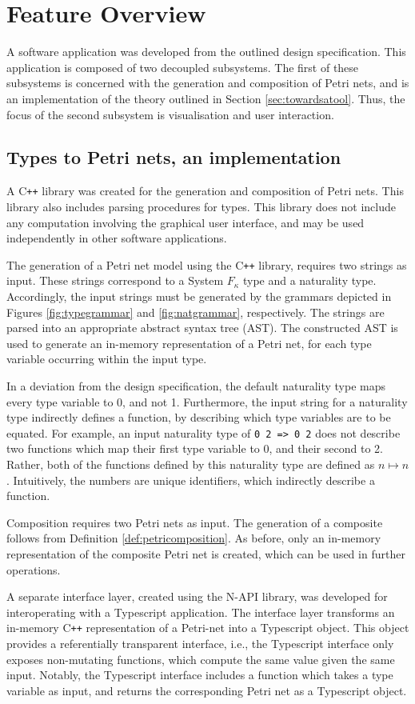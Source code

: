 \documentclass[../Dissertation.tex]{subfiles}
\begin{document}
\section{Feature Overview}
A software application was developed from the outlined design specification. This application is composed of two decoupled subsystems. The first of these subsystems is concerned with the generation and composition of Petri nets, and is an implementation of the theory outlined in Section \ref{sec:towardsatool}. Thus, the focus of the second subsystem is visualisation and user interaction.

\subsection{Types to Petri nets, an implementation}
A C\lstinline{++} library was created for the generation and composition of Petri nets. This library also includes parsing procedures for types. This library does not include any computation involving the graphical user interface, and may be used independently in other software applications.
\par
The generation of a Petri net model using the C\lstinline{++} library, requires two strings as input. These strings correspond to a System $F_\kappa$ type and a naturality type. Accordingly, the input strings must be generated by the grammars depicted in Figures \ref{fig:typegrammar} and \ref{fig:natgrammar}, respectively. The strings are parsed into an appropriate abstract syntax tree (AST). The constructed AST is used to generate an in-memory representation of a Petri net, for each type variable occurring within the input type.
\par
In a deviation from the design specification, the default naturality type maps every type variable to 0, and not 1. Furthermore, the input string for a naturality type indirectly defines a function, by describing which type variables are to be equated. For example, an input naturality type of \lstinline{0 2 => 0 2} does not describe two functions which map their first type variable to 0, and their second to 2. Rather, both of the functions defined by this naturality type are defined as $n \mapsto n$. Intuitively, the numbers are unique identifiers, which indirectly describe a function.
\par
Composition requires two Petri nets as input. The generation of a composite follows from Definition \ref{def:petricomposition}. As before, only an in-memory representation of the composite Petri net is created, which can be used in further operations.
\par
A separate interface layer, created using the N-API library, was developed for interoperating with a Typescript application. The interface layer transforms an in-memory C\lstinline{++} representation of a Petri-net into a Typescript object. This object provides a referentially transparent interface, i.e., the Typescript interface only exposes non-mutating functions, which compute the same value given the same input. Notably, the Typescript interface includes a function which takes a type variable as input, and returns the corresponding Petri net as a Typescript object.
\end{document}
